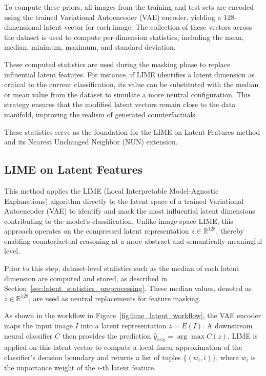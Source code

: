 To compute these priors, all images from the training and test sets are encoded using the trained Variational Autoencoder (VAE) encoder, yielding a 128-dimensional latent vector for each image. The collection of these vectors across the dataset is used to compute per-dimension statistics, including the mean, median, minimum, maximum, and standard deviation.

These computed statistics are used during the masking phase to replace influential latent features. For instance, if LIME identifies a latent dimension as critical to the current classification, its value can be substituted with the median or mean value from the dataset to simulate a more neutral configuration. This strategy ensures that the modified latent vectors remain close to the data manifold, improving the realism of generated counterfactuals.

These statistics serve as the foundation for the LIME on Latent Features method and its Nearest Unchanged Neighbor (NUN) extension.


\subsection{LIME on Latent Features}
\label{sec:lime_on_latent}

This method applies the LIME (Local Interpretable Model-Agnostic Explanations) algorithm directly to the latent space of a trained Variational Autoencoder (VAE) to identify and mask the most influential latent dimensions contributing to the model's classification. Unlike image-space LIME, this approach operates on the compressed latent representation $z \in \mathbb{R}^{128}$, thereby enabling counterfactual reasoning at a more abstract and semantically meaningful level.

Prior to this step, dataset-level statistics such as the median of each latent dimension are computed and stored, as described in Section~\ref{sec:latent_statistics_preprocessing}. These median values, denoted as $\bar{z} \in \mathbb{R}^{128}$, are used as neutral replacements for feature masking.

As shown in the workflow in Figure~\ref{fig:lime_latent_workflow}, the VAE encoder maps the input image $I$ into a latent representation $z = E(I)$. A downstream neural classifier $C$ then provides the prediction $\hat{y}_{\text{orig}} = \arg\max C(z)$. LIME is applied on this latent vector to compute a local linear approximation of the classifier’s decision boundary and returns a list of tuples $\{(w_i, i)\}$, where $w_i$ is the importance weight of the $i$-th latent feature.

